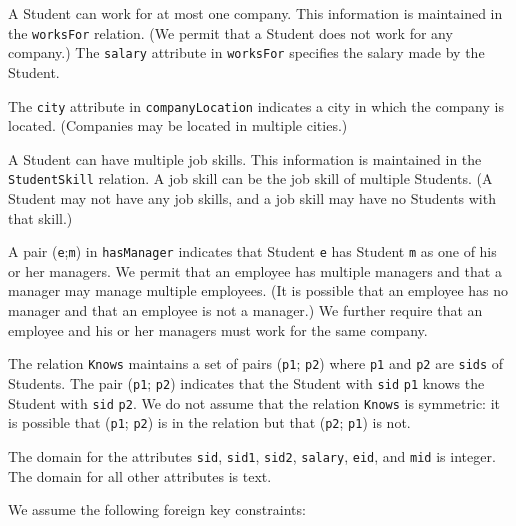 \documentclass{article}
\begin{document}
A Student can work for at most one company. This information is maintained in the \texttt{worksFor} relation. (We permit that a Student does not work for any company.) The \texttt{salary} attribute in \texttt{worksFor} specifies the salary made by the Student.

The \texttt{city} attribute in \texttt{companyLocation} indicates a city in which the company is located. (Companies may be located in multiple cities.)

A Student can have multiple job skills. This information is maintained in the \texttt{StudentSkill} relation. A job skill can be the job skill of multiple Students. (A Student may not have any job skills, and a job skill may have no Students with that skill.)

A pair (\texttt{e};\texttt{m}) in \texttt{hasManager} indicates that Student \texttt{e} has Student \texttt{m} as one of his or her managers. We permit that an employee has multiple managers and that a manager may manage multiple employees. (It is possible that an employee has no manager and that an employee is not a manager.) We further require that an employee and his or her managers must work for the same company.

The relation \texttt{Knows} maintains a set of pairs (\texttt{p1}; \texttt{p2}) where \texttt{p1} and \texttt{p2} are \texttt{sids} of Students. The pair (\texttt{p1}; \texttt{p2}) indicates that the Student with \texttt{sid} \texttt{p1} knows the Student with \texttt{sid} \texttt{p2}. We do not assume that the relation \texttt{Knows} is symmetric: it is possible that (\texttt{p1}; \texttt{p2}) is in the relation but that (\texttt{p2}; \texttt{p1}) is not.

The domain for the attributes \texttt{sid}, \texttt{sid1}, \texttt{sid2}, \texttt{salary}, \texttt{eid}, and \texttt{mid} is integer. The domain for all other attributes is text.

We assume the following foreign key constraints:
\end{document}
